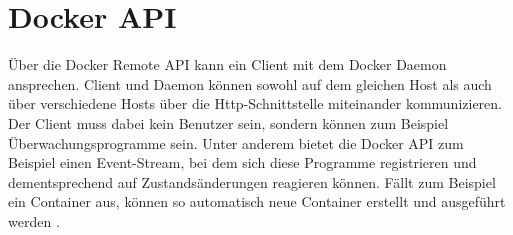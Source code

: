 
\section{Docker API}
Über die Docker Remote API kann ein Client mit dem Docker Daemon ansprechen. Client und Daemon können sowohl auf dem gleichen Host als auch über verschiedene Hosts über die Http-Schnittstelle miteinander kommunizieren. Der Client muss dabei kein Benutzer sein, sondern können zum Beispiel Überwachungsprogramme sein. Unter anderem bietet die Docker API zum Beispiel einen Event-Stream, bei dem sich diese Programme registrieren und dementsprechend auf Zustandsänderungen reagieren können. Fällt zum Beispiel ein Container aus, können so automatisch neue Container erstellt und ausgeführt werden \cite{docker:api}.\\



%
%
